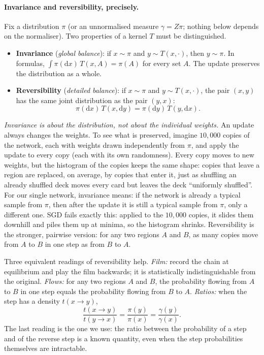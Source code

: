 \documentclass[11pt]{article}
\theoremstyle{definition}
\theoremstyle{remark}
\newcommand{\dd}{\mathrm{d}}
\begin{document}
\paragraph{Invariance and reversibility, precisely.} Fix a distribution $\pi$ (or an unnormalised measure $\gamma=Z\pi$;
nothing below depends on the normaliser). Two properties of a kernel $T$ must be distinguished.
\begin{itemize}[nosep]
\item \textbf{Invariance} (\emph{global balance}): if $x\sim\pi$ and $y\sim T(x,\cdot)$, then $y\sim\pi$. In formulas,
  $\int\pi(\dd x)\,T(x,A)=\pi(A)$ for every set $A$. The update preserves the distribution as a whole.
\item \textbf{Reversibility} (\emph{detailed balance}): if $x\sim\pi$ and $y\sim T(x,\cdot)$, the pair $(x,y)$ has the same
  joint distribution as the pair $(y,x)$:
  \[
  \pi(\dd x)\,T(x,\dd y)=\pi(\dd y)\,T(y,\dd x).
  \]
\end{itemize}
\emph{Invariance is about the distribution, not about the individual weights.} An update always changes the weights. To
see what is preserved, imagine $10{,}000$ copies of the network, each with weights drawn independently from $\pi$, and
apply the update to every copy (each with its own randomness). Every copy moves to new weights, but the histogram of the
copies keeps the same shape: copies that leave a region are replaced, on average, by copies that enter it, just as
shuffling an already shuffled deck moves every card but leaves the deck ``uniformly shuffled''. For our single network,
invariance means: if the network is already a typical sample from $\pi$, then after the update it is still a typical
sample from $\pi$, only a different one. SGD fails exactly this: applied to the $10{,}000$ copies, it slides them downhill
and piles them up at minima, so the histogram shrinks. Reversibility is the stronger, pairwise version: for any two regions
$A$ and $B$, as many copies move from $A$ to $B$ in one step as from $B$ to $A$.

Three equivalent readings of reversibility help. \emph{Film:} record the chain at equilibrium and play the film backwards;
it is statistically indistinguishable from the original. \emph{Flows:} for any two regions $A$ and $B$, the probability
flowing from $A$ to $B$ in one step equals the probability flowing from $B$ to $A$. \emph{Ratios:} when the step has a
density $t(x\to y)$,
\[
\frac{t(x\to y)}{t(y\to x)}=\frac{\pi(y)}{\pi(x)}=\frac{\gamma(y)}{\gamma(x)} .
\]
The last reading is the one we use: the ratio between the probability of a step and of the reverse step is a known
quantity, even when the step probabilities themselves are intractable.
\end{document}

